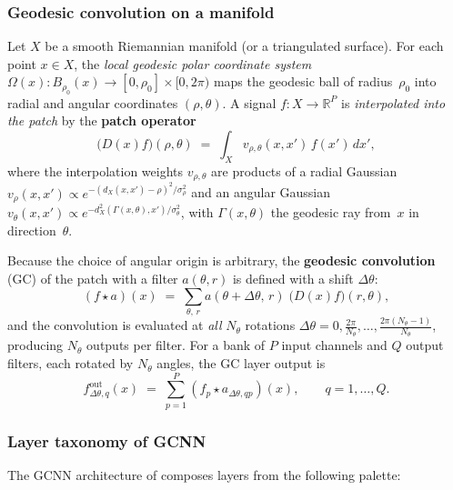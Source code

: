 \documentclass[11pt,oneside]{amsbook}
\numberwithin{equation}{section}
\theoremstyle{plain}
\theoremstyle{definition}
\theoremstyle{remark}
\begin{document}
\subsubsection{Geodesic convolution on a manifold}
Let $X$ be a smooth Riemannian manifold (or a triangulated surface).  For each point $x\in X$, the \emph{local geodesic polar coordinate system} $\Omega(x)\colon B_{\rho_0}(x)\to [0,\rho_0]\times [0,2\pi)$ maps the geodesic ball of radius~$\rho_0$ into radial and angular coordinates $(\rho,\theta)$.  A signal $f\colon X\to\mathbb{R}^P$ is \emph{interpolated into the patch} by the \textbf{patch operator}
\begin{equation}
  \bigl(D(x)f\bigr)(\rho,\theta)
  \;=\;
  \int_X v_{\rho,\theta}(x,x')\,f(x')\,dx',
  \label{eq:patch_operator}
\end{equation}
where the interpolation weights $v_{\rho,\theta}$ are products of a radial Gaussian $v_\rho(x,x')\propto e^{-(d_X(x,x')-\rho)^2/\sigma_\rho^2}$ and an angular Gaussian $v_\theta(x,x')\propto e^{-d_X^2(\Gamma(x,\theta),x')/\sigma_\theta^2}$, with $\Gamma(x,\theta)$ the geodesic ray from~$x$ in direction~$\theta$.

Because the choice of angular origin is arbitrary, the \textbf{geodesic convolution} (GC) of the patch with a filter $a(\theta,r)$ is defined with a shift $\Delta\theta$:
\begin{equation}
  (f\star a)(x)
  \;=\;
  \sum_{\theta,\,r} a(\theta+\Delta\theta,\,r)\;\bigl(D(x)f\bigr)(r,\theta),
  \label{eq:geodesic_convolution}
\end{equation}
and the convolution is evaluated at \emph{all} $N_\theta$ rotations $\Delta\theta = 0,\frac{2\pi}{N_\theta},\ldots,\frac{2\pi(N_\theta-1)}{N_\theta}$, producing $N_\theta$ outputs per filter.  For a bank of $P$ input channels and $Q$ output filters, each rotated by $N_\theta$ angles, the GC layer output is
\begin{equation}
  f^{\mathrm{out}}_{\Delta\theta,q}(x)
  \;=\;
  \sum_{p=1}^{P} (f_p\star a_{\Delta\theta,qp})(x),
  \qquad q=1,\ldots,Q.
  \label{eq:gc_layer}
\end{equation}

\subsubsection{Layer taxonomy of GCNN}
\label{subsubsec:gcnn_layers}
The GCNN architecture of \cite{Masci2015GCNN} composes layers from the following palette:
\end{document}
